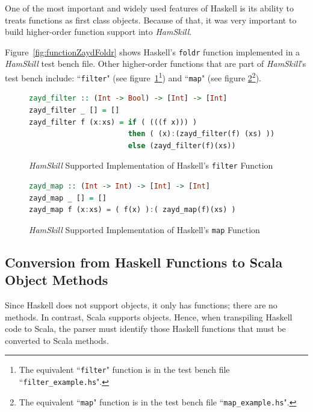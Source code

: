 \documentclass{report}
\begin{document}
One of the most important and widely used features of Haskell is its ability to treats functions as first class objects.  Because of that, it was very important to build higher-order function support into \textit{HamSkill}.

Figure~\ref{fig:functionZaydFoldr} shows Haskell's \texttt{foldr} function implemented in a \textit{HamSkill} test bench file.  Other higher-order functions that are part of \textit{HamSkill}'s test bench include: ``\texttt{filter}" (see figure~\ref{fig:haskellFunctionFilter}\footnote{The equivalent ``\texttt{filter}" function is in the test bench file ``\texttt{filter\_example.hs}".}) and ``\texttt{map}" (see figure \ref{fig:haskellFunctionMap}\footnote{The equivalent ``\texttt{map}" function is in the test bench file ``\texttt{map\_example.hs}".}).

\begin{figure}[H]
\begin{mdframed}
\begin{lstlisting}[language=Haskell, basicstyle=\small]
zayd_filter :: (Int -> Bool) -> [Int] -> [Int]
zayd_filter _ [] = []
zayd_filter f (x:xs) = if ( (((f x))) )
                       then ( (x):(zayd_filter(f) (xs) ))
                       else (zayd_filter(f)(xs))
\end{lstlisting}
\end{mdframed}
\caption{\textit{HamSkill} Supported Implementation of Haskell's \texttt{filter} Function}\label{fig:haskellFunctionFilter}
\end{figure}

\begin{figure}[H]
\begin{mdframed}
\begin{lstlisting}[language=Haskell]
zayd_map :: (Int -> Int) -> [Int] -> [Int]
zayd_map _ [] = []
zayd_map f (x:xs) = ( f(x) ):( zayd_map(f)(xs) )
\end{lstlisting}
\end{mdframed}
\caption{\textit{HamSkill} Supported Implementation of Haskell's \texttt{map} Function}\label{fig:haskellFunctionMap}
\end{figure}

\subsection{Conversion from Haskell Functions to Scala Object Methods}

Since Haskell does not support objects, it only has functions; there are no methods.  In contrast, Scala supports objects.  Hence, when transpiling Haskell code to Scala, the parser must identify those Haskell functions that must be converted to Scala methods.  
\end{document}
